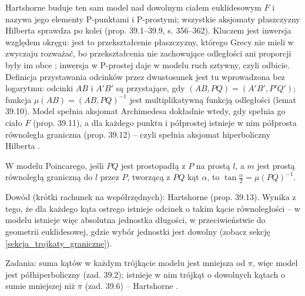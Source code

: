 Hartshorne \cite[s. 355--356]{hartshorne_2000} buduje ten sam model nad dowolnym ciałem euklidesowym $F$ i nazywa jego elementy P-punktami i P-prostymi; wszystkie aksjomaty płaszczyzny Hilberta sprawdza po kolei (prop. 39.1--39.9, s. 356--362). %
Kluczem jest inwersja względem okręgu: jest to przekształcenie płaszczyzny, którego Grecy nie mieli w zwyczaju rozważać, bo przekształcenia nie zachowujące odległości ani proporcji były im obce \cite[s. 334]{hartshorne_2000}; inwersja w P-prostej daje w modelu ruch sztywny, czyli odbicie. %
Definicja przystawania odcinków przez dwustosunek jest tu wprowadzona bez logarytmu: odcinki $AB$ i $A'B'$ są przystające, gdy $(AB, PQ) = (A'B', P'Q')$; funkcja $\mu(AB) = (AB, PQ)^{-1}$ jest multiplikatywną funkcją odległości \cite[s. 358, 363]{hartshorne_2000} (lemat 39.10). %
Model spełnia aksjomat Archimedesa dokładnie wtedy, gdy spełnia go ciało $F$ (prop. 39.11), a dla każdego punktu i półprostej istnieje w nim półprosta równoległa graniczna (prop. 39.12) -- czyli spełnia aksjomat hiperboliczny Hilberta \cite[s. 363--364]{hartshorne_2000}. %

\begin{theorem}
	W modelu Poincarego, jeśli $PQ$ jest prostopadłą z $P$ na prostą $l$, a $m$ jest prostą równoległą graniczną do $l$ przez $P$, tworzącą z $PQ$ kąt $\alpha$, to $\tan\tfrac{\alpha}{2} = \mu(PQ)^{-1}$. %
\end{theorem}

Dowód (krótki rachunek na współrzędnych): Hartshorne \cite[s. 364--365]{hartshorne_2000} (prop. 39.13). %
Wynika z tego, że dla każdego kąta ostrego istnieje odcinek o takim kącie równoległości -- w modelu istnieje więc absolutna jednostka długości, w przeciwieństwie do geometrii euklidesowej, gdzie wybór jednostki jest dowolny \cite[s. 365--366]{hartshorne_2000} (zobacz sekcję \ref{sekcja_trojkaty_graniczne}). %

Zadania: suma kątów w każdym trójkącie modelu jest mniejsza od $\pi$, więc model jest półhiperboliczny (zad. 39.2); istnieje w nim trójkąt o dowolnych kątach o sumie mniejszej niż $\pi$ (zad. 39.6) -- Hartshorne \cite[s. 366]{hartshorne_2000}. %


